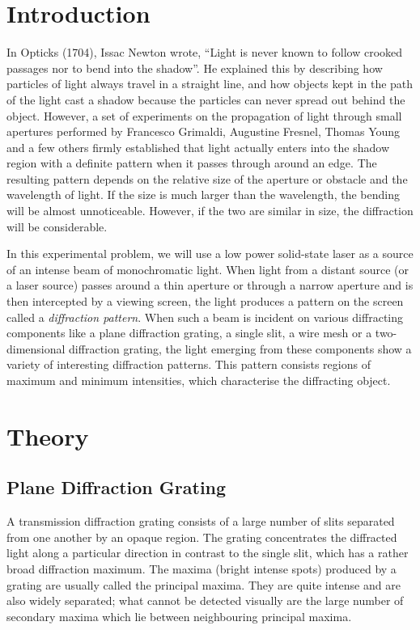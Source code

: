 \section*{Introduction}
	 
In Opticks (1704), Issac Newton wrote, ``Light is never known to follow crooked passages nor to bend into the shadow''. He explained this by describing how particles of light always travel in a straight line, and how objects kept in the path of the light cast a shadow because the particles can never spread out behind the object. However, a set of experiments on the propagation of light through small apertures performed by Francesco Grimaldi, Augustine Fresnel, Thomas Young and a few others firmly established that light actually enters into the shadow region with a definite pattern when it passes through around an edge. The resulting pattern depends on the relative size of the aperture or obstacle and the wavelength of light. If the size is much larger than the wavelength, the bending will be almost unnoticeable. However, if the two are similar in size, the diffraction will be considerable.    
     
In this experimental problem, we will use a low power solid-state laser as a source of an intense beam of monochromatic light. When light from a distant source (or a laser source) passes around a thin aperture or through a narrow aperture and is then intercepted by a viewing screen, the light produces a pattern on the screen called a \textit{diffraction pattern}. When such a beam is incident on various diffracting components like a plane diffraction grating, a single slit, a wire mesh or a two-dimensional diffraction grating, the light emerging from these components show a variety of interesting diffraction patterns. This pattern consists regions of maximum and minimum intensities, which characterise the diffracting object. 

\section*{Theory}

\subsection*{Plane Diffraction Grating}

A transmission diffraction grating consists of a large number of slits separated from one another by an opaque region. The grating concentrates the diffracted light along a particular direction in contrast to the single slit, which has a rather broad diffraction maximum. The maxima (bright intense spots) produced by a grating are usually called the principal maxima. They are quite intense and are also widely separated; what cannot be detected visually are the large number of secondary maxima which lie between neighbouring principal maxima.

